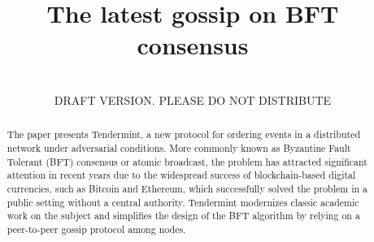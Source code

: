 \documentclass[conference,onecolumn,draft,a4paper]{IEEEtran}
\begin{document}
%
\title{The latest gossip on BFT consensus}


\author{
	\\
	DRAFT VERSION. PLEASE DO NOT DISTRIBUTE
}


\maketitle


\begin{abstract}
The paper presents Tendermint, a new protocol for ordering events in a distributed network under adversarial conditions. More commonly known as Byzantine Fault Tolerant (BFT) consensus or atomic broadcast, the problem has attracted significant attention in recent years due to the widespread success of blockchain-based digital currencies, such as Bitcoin and Ethereum, which successfully solved the problem in a public setting without a central authority. Tendermint modernizes classic academic work on the subject and simplifies the design of the BFT algorithm by relying on a peer-to-peer gossip protocol among nodes. 
\end{abstract}












\end{document}
